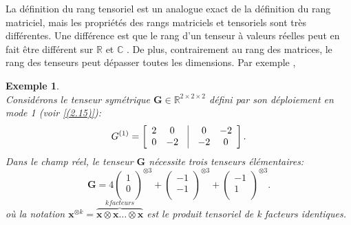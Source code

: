 \documentclass[11pt,a4paper,oneside]{book}
\newtheorem{ex}{Exemple}[chapter]}
\def\R{\mathbb R}
\def\C{\mathbb C}
\def\x{\mathbf x}
\newcommand{\mbf}[1]{\mathbf{#1}}
\begin{document}
La définition du rang tensoriel est un analogue exact de la définition du rang matriciel, mais les propriétés des rangs matriciels et tensoriels sont très différentes. Une différence est que le rang d'un tenseur à valeurs réelles peut en fait être différent sur $ \R $ et $ \C $ \cite[p.464]{Hong2008}. De plus, contrairement au rang des matrices, le rang des tenseurs peut dépasser toutes les dimensions. Par exemple \cite[p.4]{comon2014tensors}, 
\begin{ex}\label{exo2.7}
	\emph{\\}
	Considérons le tenseur symétrique $\mbf{G} \in \R^{2\times 2 \times 2}$ défini par son déploiement en mode 1 (voir \eqref{(2.15)}):
	$$
	G^{(1)}=
	\begin{bmatrix}
	\begin{array}{*{5}{c}}
	2&0&\vline&0&-2\\
	0&-2&\vline&-2&0\\
	\end{array}
	\end{bmatrix}.
	$$
	Dans le champ réel, le tenseur $\mbf{G}$ nécessite trois tenseurs élémentaires:
	$$
	\mbf{G} = 4
	\begin{pmatrix}
	1\\
	0\\
	\end{pmatrix}
	^{\otimes 3}+
	\begin{pmatrix}
	-1\\
	-1\\
	\end{pmatrix}
	^{\otimes 3}+
	\begin{pmatrix}
	-1\\
	1\\
	\end{pmatrix}^{\otimes 3}.
	$$
	où la notation $ \x^{\otimes k} = \overbrace{\x \otimes \x \ldots \otimes \x}^{k facteurs}$ est le produit tensoriel de k facteurs identiques.
	

\end{ex}
\end{document}
